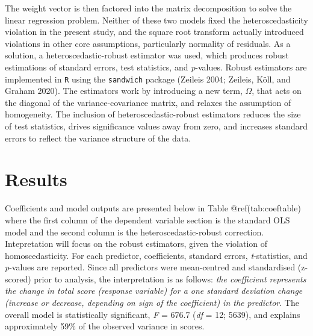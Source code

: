 \documentclass{article}
\begin{document}
The weight vector is then factored into the matrix decomposition to
solve the linear regression problem. Neither of these two models fixed
the heteroscedasticity violation in the present study, and the square
root transform actually introduced violations in other core assumptions,
particularly normality of residuals. As a solution, a
heteroscedastic-robust estimator was used, which produces robust
estimations of standard errors, test statistics, and \emph{p}-values.
Robust estimators are implemented in \texttt{R} using the
\texttt{sandwich} package (Zeileis 2004; Zeileis, Köll, and Graham
2020). The estimators work by introducing a new term, \(\Omega\), that
acts on the diagonal of the variance-covariance matrix, and relaxes the
assumption of homogeneity. The inclusion of heteroscedastic-robust
estimators reduces the size of test statistics, drives significance
values away from zero, and increases standard errors to reflect the
variance structure of the data.

\hypertarget{results}{%
\section{Results}\label{results}}

Coefficients and model outputs are presented below in Table
@ref(tab:coeftable) where the first column of the dependent variable
section is the standard OLS model and the second column is the
heteroscedastic-robust correction. Intepretation will focus on the
robust estimators, given the violation of homoscedasticity. For each
predictor, coefficients, standard errors, \emph{t}-statistics, and
\emph{p}-values are reported. Since all predictors were mean-centred and
standardised (z-scored) prior to analysis, the interpretation is as
follows: \emph{the coefficient represents the change in total score
(response variable) for a one standard deviation change (increase or
decrease, depending on sign of the coefficient) in the predictor}. The
overall model is statistically significant, \emph{F} = 676.7 (\emph{df}
= 12; 5639), and explains approximately 59\% of the observed variance in
scores.
\end{document}
